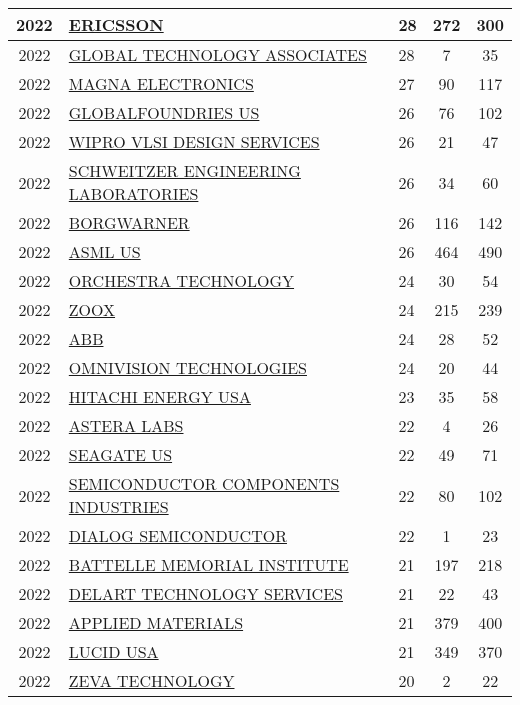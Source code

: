\documentclass{article}%
\begin{document}
\begin{longtable}{c|p{20em}|p{5em}|c|c}
2022&\hyperref[subsec:ERICSSON]{ERICSSON}&28&272&300\\%
\hline%
2022&\hyperref[subsec:GLOBALTECHNOLOGYASSOCIATES]{GLOBAL TECHNOLOGY ASSOCIATES}&28&7&35\\%
\hline%
2022&\hyperref[subsec:MAGNAELECTRONICS]{MAGNA ELECTRONICS}&27&90&117\\%
\hline%
2022&\hyperref[subsec:GLOBALFOUNDRIESUS]{GLOBALFOUNDRIES US}&26&76&102\\%
\hline%
2022&\hyperref[subsec:WIPROVLSIDESIGNSERVICES]{WIPRO VLSI DESIGN SERVICES}&26&21&47\\%
\hline%
2022&\hyperref[subsec:SCHWEITZERENGINEERINGLABORATORIES]{SCHWEITZER ENGINEERING LABORATORIES}&26&34&60\\%
\hline%
2022&\hyperref[subsec:BORGWARNER]{BORGWARNER}&26&116&142\\%
\hline%
2022&\hyperref[subsec:ASMLUS]{ASML US}&26&464&490\\%
\hline%
2022&\hyperref[subsec:ORCHESTRATECHNOLOGY]{ORCHESTRA TECHNOLOGY}&24&30&54\\%
\hline%
2022&\hyperref[subsec:ZOOX]{ZOOX}&24&215&239\\%
\hline%
2022&\hyperref[subsec:ABB]{ABB}&24&28&52\\%
\hline%
2022&\hyperref[subsec:OMNIVISIONTECHNOLOGIES]{OMNIVISION TECHNOLOGIES}&24&20&44\\%
\hline%
2022&\hyperref[subsec:HITACHIENERGYUSA]{HITACHI ENERGY USA}&23&35&58\\%
\hline%
2022&\hyperref[subsec:ASTERALABS]{ASTERA LABS}&22&4&26\\%
\hline%
2022&\hyperref[subsec:SEAGATEUS]{SEAGATE US}&22&49&71\\%
\hline%
2022&\hyperref[subsec:SEMICONDUCTORCOMPONENTSINDUSTRIES]{SEMICONDUCTOR COMPONENTS INDUSTRIES}&22&80&102\\%
\hline%
2022&\hyperref[subsec:DIALOGSEMICONDUCTOR]{DIALOG SEMICONDUCTOR}&22&1&23\\%
\hline%
2022&\hyperref[subsec:BATTELLEMEMORIALINSTITUTE]{BATTELLE MEMORIAL INSTITUTE}&21&197&218\\%
\hline%
2022&\hyperref[subsec:DELARTTECHNOLOGYSERVICES]{DELART TECHNOLOGY SERVICES}&21&22&43\\%
\hline%
2022&\hyperref[subsec:APPLIEDMATERIALS]{APPLIED MATERIALS}&21&379&400\\%
\hline%
2022&\hyperref[subsec:LUCIDUSA]{LUCID USA}&21&349&370\\%
\hline%
2022&\hyperref[subsec:ZEVATECHNOLOGY]{ZEVA TECHNOLOGY}&20&2&22\\%

\end{longtable}
\end{document}
